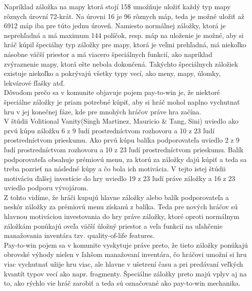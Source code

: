 \documentclass[10pt,oneside,slovak,a4paper]{article}
\begin{document}
Napríklad záložka na mapy ktorá stojí 15\$ umožňuje uložiť každý typ mapy rôznych úrovní 72-krát. Na úrovni 16 je 96 rôznych máp, teda je možné uložiť až 6912 máp iba pre túto jednu úroveň. Namiesto normálnej záložky, ktorá je neprehľadná a má maximum 144 políčok, resp. máp na uloženie je možné, aby si hráč kúpil špeciálny typ záložky pre mapy, ktorá je veľmi prehľadná, má niekoľko násobne väčší priestor a má viacero špeciálnych funkcií, ako napríklad zvýraznenie mapy, ktorá ešte nebola dokončená. Takýchto špeciálnych záložiek existuje niekoľko a pokrývajú všetky typy vecí, ako meny, mapy, úlomky, lekvárové fľašky atď.\\

Dôvodom prečo sa v komunite objavuje pojem pay-to-win je, že niektoré špeciálne záložky je priam potrebné kúpiť, aby si hráč mohol naplno vychutnať hru v jej konečnej fáze, kde pre mnohých hráčov práve hra začína.\\

V štúdii Volitional Vanity(Singh Martinez, Mauricio \& Tang, Sini)\cite{Volitional-Vanity} uviedlo ako prvú kúpu záložku 6 z 9 ľudí prostredníctvom rozhovoru a 10 z 23 ľudí prostredníctvom prieskumu. Ako prvú kúpu balíka podporovateľa uviedlo 2 z 9 ľudí prostredníctvom rozhovoru a 10 z 23 ľudí prostredníctvom prieskumu. Balík podporovateľa obsahuje prémiovú menu, za ktorú za záložky dajú kúpiť a teda sa treba pozrieť na následné kúpy a čo bola ich motivácia. V tejto istej štúdii motiváciu ďalšej investície do hry uviedlo 19 z 23 ľudí práve záložky a 16 z 23 uviedlo podporu vývojárom.\\

Z tohto vidíme, že hráči kupujú hlavne záložky alebo balík podporovateľa a neskôr záložky za prémiovú menu získanú z balíka. Teda pre nových hráčov sú hlavnou motiváciou investovania do hry práve záložky, ktoré oproti normálnym záložkám ponúkajú oveľa väčší úložný priestor a veľa funkcií na uľahčenie manažovania inventára tzv. quality-of-life features.\\

Pay-to-win pojem sa v komunite vyskytuje práve preto, že tieto záložky ponúkajú obrovské výhody nielen v ľahšom manažovaní inventára, čo hráčovi umožní si hru viac vychutnať užije hru viac, ale hlavne v ušetrení času a pri predávaní veľkých kvantít typov vecí ako napr. fragmenty. Špeciálne záložky preto majú vplyv aj na to, ako rýchlo vie hráč zarobiť a teda sú označované ako pay-to-win mechanika.





\nocite{*}


\end{document}
